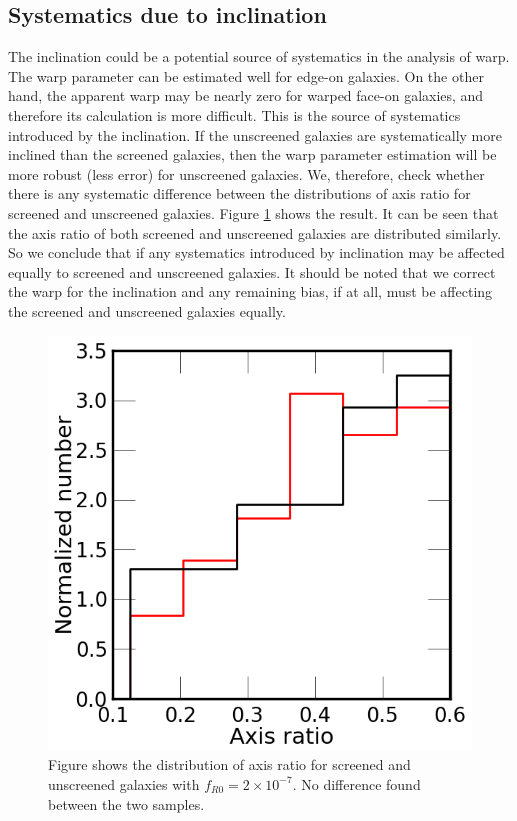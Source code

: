 \documentclass[useAMS,usenatbib,twocolumn]{mn2e}
\begin{document}
\subsection{Systematics due to inclination}
\label{ap:inclination-systematic}
The inclination could be a potential source of systematics in the analysis of
warp. The warp parameter can be estimated well for edge-on galaxies. On
the other
hand, the apparent warp may be nearly zero for warped face-on galaxies, and 
therefore its calculation is more difficult. This is the
source of systematics introduced by the inclination. If the unscreened galaxies
are systematically more inclined than the screened galaxies, then the warp
parameter estimation will be more robust (less error) for unscreened galaxies. 
We, therefore, check whether there is any systematic difference between the
distributions of axis ratio for screened and unscreened galaxies. Figure
\ref{warp-incl} shows the result. It can be seen that the axis ratio
of both screened and unscreened galaxies are distributed similarly. So we
conclude that if any systematics introduced by inclination may be affected
equally to screened and unscreened galaxies. It should be noted that we
correct the warp for the inclination and any remaining bias, if at all,
must be affecting the screened and unscreened galaxies equally.\\

\begin{figure}
\begin{center}
  \includegraphics[scale=0.4]{figures/axis-ratio-dist.png}
\caption{Figure shows the distribution of axis ratio for screened and
unscreened galaxies with $f_{R0}=2\times10^{-7}$. No difference found between
the two samples.}
\label{warp-incl}
\end{center}
\end{figure}
\end{document}
